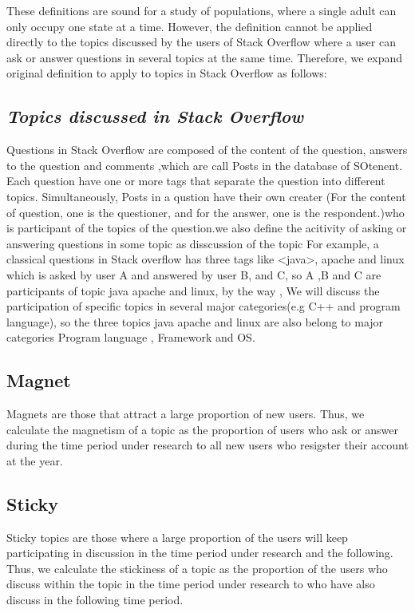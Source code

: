 \documentclass[conference]{IEEEtran}
\begin{document}
These definitions are sound for a study of populations, where a single adult can only occupy one state at a time. However, the definition cannot be applied directly to the topics discussed by the users of Stack Overflow where a user can ask or answer questions in several topics at the same time. Therefore, we expand original definition to apply to topics in Stack Overflow as follows:

\medskip
\subsection*{\textit{\textbf{Topics discussed in Stack Overflow}}}

Questions in Stack Overflow are composed of the content of the question, answers to the question and comments ,which are call Posts in the database of SOtenent. Each question have one or more tags that separate the question into different topics. Simultaneously, Posts in a qustion have their own creater (For the content of question, one is the questioner, and for the answer, one is the respondent.)who is participant of the topics of the question.we also define the acitivity of asking or answering questions in some topic as disscussion of the topic For example, a classical questions in Stack overflow has three tags like <java>, apache and linux which is asked by user A and answered by user B, and C, so A ,B and C are participants of topic java apache and linux, by the way , We will discuss the participation of specific topics in several major categories(e.g C++ and program language), so the three topics java apache and linux are also belong to major categories Program language , Framework and OS.

\subsection*{Magnet}
Magnets are those that attract a large proportion of new users. Thus, we calculate the magnetism of a topic as the proportion of users who ask or answer during the time period under research to all new users who resigster their account at the year.

\subsection*{Sticky}
Sticky topics are those where a large proportion of the users will keep participating in discussion in the time period under research and the following. Thus, we calculate the stickiness of a topic as the proportion of the users who discuss within the topic in the time period under research to who have also discuss in the following time period.
\end{document}
